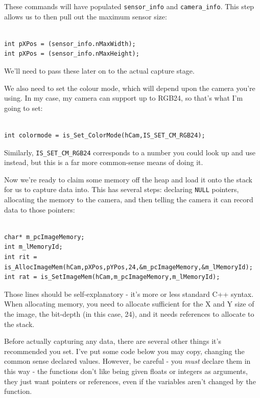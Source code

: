 \documentclass[12pt,a4paper]{article}
\begin{document}
These commands will have populated \texttt{sensor\_info} and \texttt{camera\_info}. This step allows us to then pull out the maximum sensor size:

\lstset{language=C++}
\begin{lstlisting}

int pXPos = (sensor_info.nMaxWidth);
int pXPos = (sensor_info.nMaxHeight);

\end{lstlisting}

We'll need to pass these later on to the actual capture stage.

We also need to set the colour mode, which will depend upon the camera you're using. In my case, my camera can support up to RGB24, so that's what I'm going to set:

\lstset{language=C++}
\begin{lstlisting}

int colormode = is_Set_ColorMode(hCam,IS_SET_CM_RGB24);

\end{lstlisting}

Similarly, \texttt{IS\_SET\_CM\_RGB24} corresponds to a number you could look up and use instead, but this is a far more common-sense means of doing it.

Now we're ready to claim some memory off the heap and load it onto the stack for us to capture data into. This has several steps: declaring \texttt{NULL} pointers, allocating the memory to the camera, and then telling the camera it can record data to those pointers:

\lstset{language=C++}
\begin{lstlisting}

char* m_pcImageMemory;
int m_lMemoryId;
int rit = is_AllocImageMem(hCam,pXPos,pYPos,24,&m_pcImageMemory,&m_lMemoryId);
int rat = is_SetImageMem(hCam,m_pcImageMemory,m_lMemoryId);

\end{lstlisting}

Those lines should be self-explanatory - it's more or less standard C++ syntax. When allocating memory, you need to allocate sufficient for the X and Y size of the image, the bit-depth (in this case, 24), and it needs references to allocate to the stack.

Before actually capturing any data, there are several other things it's recommended you set. I've put some code below you may copy, changing the common sense declared values. However, be careful - you \emph{must} declare them in this way - the functions don't like being given floats or integers as arguments, they just want pointers or references, even if the variables aren't changed by the function.
\end{document}
